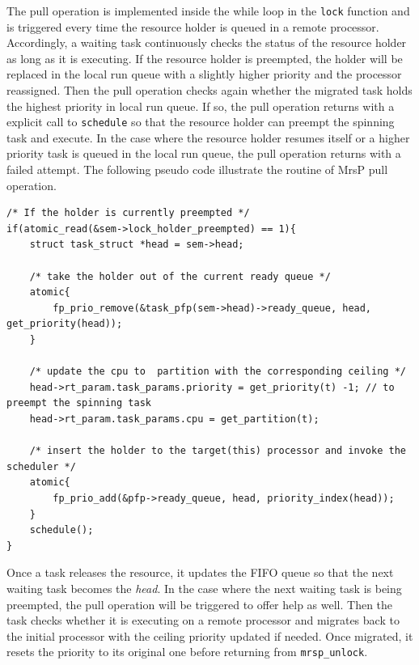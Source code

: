 \documentclass{report}
\begin{document}
The pull operation is implemented inside the while loop in the \texttt{lock} function and is triggered every time the resource holder is queued in a remote processor. Accordingly, a waiting task continuously checks the status of the resource holder as long as it is executing. If the resource holder is preempted, the holder will be replaced in the local run queue with a slightly higher priority and the processor reassigned. Then the pull operation checks again whether the migrated task holds the highest priority in local run queue. If so, the pull operation returns with a explicit call to \texttt{schedule} so that the resource holder can preempt the spinning task and execute. In the case where the resource holder resumes itself or a higher priority task is queued in the local run queue, the pull operation returns with a failed attempt. The following pseudo code illustrate the routine of MrsP pull operation.

\begin{lstlisting}
/* If the holder is currently preempted */
if(atomic_read(&sem->lock_holder_preempted) == 1){
	struct task_struct *head = sem->head;

	/* take the holder out of the current ready queue */
	atomic{
		fp_prio_remove(&task_pfp(sem->head)->ready_queue, head, get_priority(head));
	}

	/* update the cpu to  partition with the corresponding ceiling */
	head->rt_param.task_params.priority = get_priority(t) -1; // to preempt the spinning task
	head->rt_param.task_params.cpu = get_partition(t);
	
	/* insert the holder to the target(this) processor and invoke the scheduler */
	atomic{
		fp_prio_add(&pfp->ready_queue, head, priority_index(head));
	}
	schedule();
}
\end{lstlisting}

Once a task releases the resource, it updates the FIFO queue so that the next waiting task becomes the \emph{head}. In the case where the next waiting task is being preempted, the pull operation will be triggered to offer help as well. Then the task checks whether it is executing on a remote processor and migrates back to the initial processor with the ceiling priority updated if needed. Once migrated, it resets the priority to its original one before returning from \texttt{mrsp\_unlock}.
\end{document}
